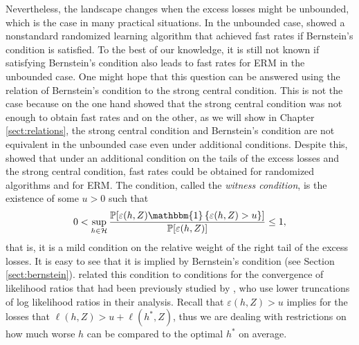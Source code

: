 \documentclass{uvamath}
\newcommand*{\calH}{\mathcal{H}}
\newcommand*{\bbP}{\mathbb{P}}
\newcommand*{\indicator}[1]{\mathbbm{1}\left\{#1\right\}}
\theoremstyle{remark}
\theoremstyle{definition}
\theoremstyle{definition}
\theoremstyle{definition}
\theoremstyle{definition}
\theoremstyle{definition}
\begin{document}
Nevertheless, the landscape changes when the excess losses might be
unbounded, which is the case in many practical situations. In the
unbounded case, \citet{audibert_fast_2009} showed a nonstandard
randomized learning algorithm that achieved fast rates if Bernstein's
condition is satisfied. To the best of our knowledge, it is still not
known if satisfying Bernstein's condition also leads to fast rates for
ERM in the unbounded case. One might hope that this question can be
answered using the relation of Bernstein's condition to the strong
central condition. This is not the case because on the one hand
\citet{grunwald_fast_2016} showed that the strong central condition
was not enough to obtain fast rates and on the other, as we will show
in Chapter \ref{sect:relations}, the strong central condition and
Bernstein's condition are not equivalent in the unbounded case even
under additional conditions. Despite this, \citet{grunwald_fast_2016}
showed that under an additional condition on the tails of the excess
losses and the strong central condition, fast rates could be obtained
for randomized algorithms and for ERM. The condition, called the
\textit{witness condition}, is the existence of some $u>0$ such that
\begin{equation*}
  0<\sup_{h\in\calH}
  \frac{\bbP[\varepsilon(h,Z)\indicator{\varepsilon(h,Z) > u}]}{\bbP[\varepsilon(h,Z)]} \leq 1,
\end{equation*}
that is, it is a mild condition on the relative weight of the right
tail of the excess losses. It is easy to see that it is implied by
Bernstein's condition (see Section
\ref{sect:bernstein}). \citet{grunwald_fast_2016} related this
condition to conditions for the convergence of likelihood ratios that
had been previously studied by \citet{wong_probability_1995}, who use
lower truncations of log likelihood ratios in their analysis.  Recall
that $\varepsilon(h,Z) > u$ implies for the losses that
$\ell(h,Z) > u + \ell(h^*,Z)$, thus we are dealing with restrictions
on how much worse $h$ can be compared to the optimal $h^*$ on average.
\end{document}
